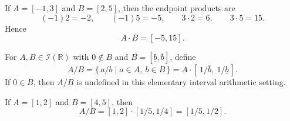 \begin{example}
If $A=[-1,3]$ and $B=[2,5]$, then the endpoint products are
\[
(-1)2=-2,\qquad (-1)5=-5,\qquad 3\cdot 2=6,\qquad 3\cdot 5=15.
\]
Hence
\[
A\cdot B=[-5,15].
\]
\end{example}

\begin{definition}
\cite{UnknownIntroductionIntervalAnalysis2002}
\label{def:interval-division}
For $A,B\in \mathcal{I}(\mathbb{R})$ with $0\notin B$ and
$B=[\underline b,\overline b]$, define
\[
A/B
=
\{\,a/b\mid a\in A,\ b\in B\,\}
=
A\cdot[\,1/\overline b,\ 1/\underline b\,].
\]
If $0\in B$, then $A/B$ is undefined in this elementary interval arithmetic setting.
\end{definition}

\begin{example}
If $A=[1,2]$ and $B=[4,5]$, then
\[
A/B
=
[1,2]\cdot [1/5,1/4]
=
[1/5,1/2].
\]
\end{example}
